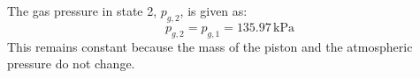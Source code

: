 The gas pressure in state 2, \( p_{g,2} \), is given as:  
\[
p_{g,2} = p_{g,1} = 135.97 \, \text{kPa}
\]  
This remains constant because the mass of the piston and the atmospheric pressure do not change.